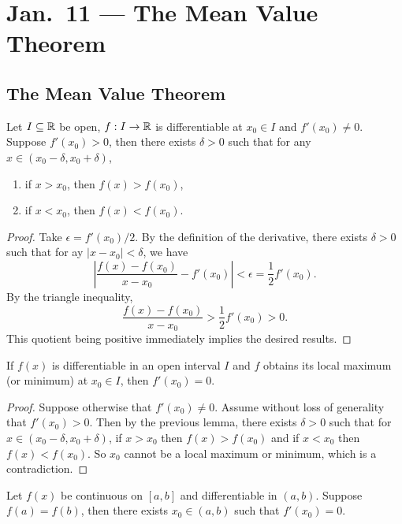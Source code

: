 \chapter{Jan.~11 --- The Mean Value Theorem}

\section{The Mean Value Theorem}
\begin{lemma}
  Let $I \subseteq \mathbb{R}$ be open, $f : I \to \mathbb{R}$
  is differentiable at $x_0 \in I$ and $f'(x_0) \ne 0$.
  Suppose $f'(x_0) > 0$, then there exists $\delta > 0$
  such that for any $x \in (x_0 - \delta, x_0 + \delta)$,
  \begin{enumerate}
    \item if $x > x_0$, then $f(x) > f(x_0)$,
    \item if $x < x_0$, then $f(x) < f(x_0)$.
  \end{enumerate}
\end{lemma}

\begin{proof}
  Take $\epsilon = f'(x_0) / 2$. By the
  definition of the derivative, there exists
  $\delta > 0$ such that for ay $|x - x_0| < \delta$,
  we have
  \[
    \left| \frac{f(x) - f(x_0)}{x - x_0} - f'(x_0) \right|
    < \epsilon = \frac{1}{2} f'(x_0).
  \]
  By the triangle inequality,
  \[
    \frac{f(x) - f(x_0)}{x - x_0}
    > \frac{1}{2} f'(x_0) > 0.
  \]
  This quotient being positive immediately implies
  the desired results.
\end{proof}

\begin{theorem}
  If $f(x)$ is differentiable in an open interval
  $I$ and $f$ obtains its local maximum (or minimum)
  at $x_0 \in I$, then $f'(x_0) = 0$.
\end{theorem}

\begin{proof}
  Suppose otherwise that $f'(x_0) \ne 0$. Assume without
  loss of generality that $f'(x_0) > 0$. Then by the
  previous lemma, there exists $\delta > 0$ such that
  for $x \in (x_0 - \delta, x_0 + \delta)$, if $x > x_0$
  then $f(x) > f(x_0)$ and if $x < x_0$ then
  $f(x) < f(x_0)$. So $x_0$ cannot be a local maximum
  or minimum, which is a contradiction.
\end{proof}

\begin{theorem}
  Let $f(x)$ be continuous on $[a, b]$ and
  differentiable in $(a, b)$. Suppose $f(a) = f(b)$,
  then there exists $x_0 \in (a, b)$ such that
  $f'(x_0) = 0$.
\end{theorem}

